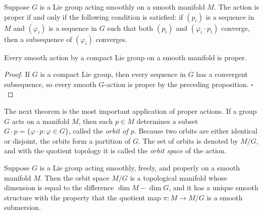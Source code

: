 \begin{proposition}[]\label{prop:proper-action-condition}
Suppose $G$ is a Lie group acting smoothly on a smooth manifold $M$. The action is proper if and only if the following condition is satisfied: if $(p_i)$ is a sequence in $M$ and $(\varphi_i)$ is a sequence in $G$ such that both $(p_i)$ and $(\varphi_i \cdot p_i)$ converge, then a subsequence of $(\varphi_i)$ converges.
\end{proposition}

\begin{corollary}[]\label{cor:compact-lie-group-actions-proper}
Every smooth action by a compact Lie group on a smooth manifold is proper.
\end{corollary}

\begin{proof}
If $G$ is a compact Lie group, then every sequence in $G$ has a convergent subsequence, so every smooth $G$-action is proper by the preceding proposition. $\square$
\end{proof}

The next theorem is the most important application of proper actions. If a group $G$ acts on a manifold $M$, then each $p \in M$ determines a subset $G \cdot p = \{\varphi \cdot p : \varphi \in G\}$, called the \textit{orbit of $p$}. Because two orbits are either identical or disjoint, the orbits form a partition of $G$. The set of orbits is denoted by $M/G$, and with the quotient topology it is called the \textit{orbit space} of the action.

\begin{theorem}\label{thm:quotient-manifold-theorem}
Suppose $G$ is a Lie group acting smoothly, freely, and properly on a smooth manifold $M$. Then the orbit space $M/G$ is a topological manifold whose dimension is equal to the difference $\dim M - \dim G$, and it has a unique smooth structure with the property that the quotient map $\pi: M \to M/G$ is a smooth submersion.
\end{theorem}

